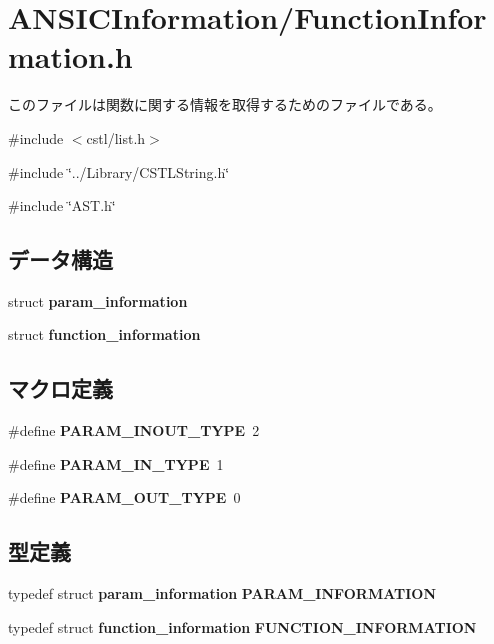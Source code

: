 \section{ANSICInformation/FunctionInformation.h}
\label{_function_information_8h}


このファイルは関数に関する情報を取得するためのファイルである。  


{\ttfamily \#include $<$cstl/list.h$>$}\par
{\ttfamily \#include \char`\"{}../Library/CSTLString.h\char`\"{}}\par
{\ttfamily \#include \char`\"{}AST.h\char`\"{}}\par
\subsection*{データ構造}
\begin{DoxyCompactItemize}
\item 
struct {\bf param\_\-information}
\item 
struct {\bf function\_\-information}
\end{DoxyCompactItemize}
\subsection*{マクロ定義}
\begin{DoxyCompactItemize}
\item 
\#define {\bfseries PARAM\_\-INOUT\_\-TYPE}~2\label{_function_information_8h_a41bd58cfae337a9de90da23ed03ea62c}

\item 
\#define {\bfseries PARAM\_\-IN\_\-TYPE}~1\label{_function_information_8h_ac68e944f7cf37f10eef2dd197a078c4d}

\item 
\#define {\bfseries PARAM\_\-OUT\_\-TYPE}~0\label{_function_information_8h_ae4b64c2b2207ba6baf2f26eb65c89fdc}

\end{DoxyCompactItemize}
\subsection*{型定義}
\begin{DoxyCompactItemize}
\item 
typedef struct {\bf param\_\-information} {\bf PARAM\_\-INFORMATION}
\item 
typedef struct {\bf function\_\-information} {\bf FUNCTION\_\-INFORMATION}
\end{DoxyCompactItemize}
